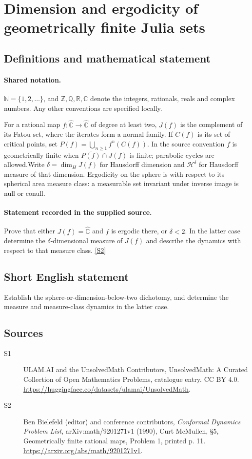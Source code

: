 \documentclass[11pt]{article}
\newcommand{\sref}[2]{\hyperlink{source:#1:#2}{[S#2]}}
\begin{document}
\section{Dimension and ergodicity of geometrically finite Julia sets}\label{statement}

\subsection{Definitions and mathematical statement}

\paragraph{Shared notation.}$\mathbb N=\{1,2,\ldots\}$, and $\mathbb Z,\mathbb Q,\mathbb R,\mathbb C$ denote the integers, rationals, reals and complex numbers. Any other conventions are specified locally.


For a rational map $f:\widehat{\mathbb C}\to\widehat{\mathbb C}$ of degree at least two, $J(f)$ is the complement of its Fatou set, where the iterates form a normal family. If $C(f)$ is its set of critical points, set $P(f)=\bigcup_{n\geq1}f^n(C(f))$. In the source convention $f$ is geometrically finite when $\overline{P(f)}\cap J(f)$ is finite; parabolic cycles are allowed.Write $\delta=\dim_H J(f)$ for Hausdorff dimension and $\mathcal H^\delta$ for Hausdorff measure of that dimension. Ergodicity on the sphere is with respect to its spherical area measure class: a measurable set invariant under inverse image is null or conull.
\paragraph{Statement recorded in the supplied source.}
Prove that either $J(f)=\widehat{\mathbb C}$ and $f$ is ergodic there, or $\delta<2$. In the latter case determine the $\delta$-dimensional measure of $J(f)$ and describe the dynamics with respect to that measure class. \sref{statement}{2}
\subsection{Short English statement}
Establish the sphere-or-dimension-below-two dichotomy, and determine the measure and measure-class dynamics in the latter case.
\subsection{Sources}
\begin{description}
\item[\hypertarget{source:statement:1}{S1}] ULAM.AI and the UnsolvedMath Contributors, UnsolvedMath: A Curated Collection of Open Mathematics Problems, catalogue entry. CC BY 4.0. \url{https://huggingface.co/datasets/ulamai/UnsolvedMath}.
\item[\hypertarget{source:statement:2}{S2}] Ben Bielefeld (editor) and conference contributors, \emph{Conformal Dynamics Problem List}, arXiv:math/9201271v1 (1990), Curt McMullen, \S5, Geometrically finite rational maps, Problem 1, printed p. 11. \url{https://arxiv.org/abs/math/9201271v1}.
\end{description}
\label{end:statement}
\end{document}
